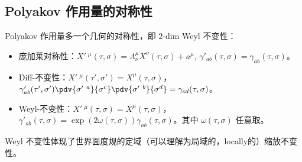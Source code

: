 \subsection{Polyakov 作用量的对称性}
\begin{theorem}{} 
	Polyakov 作用量多一个几何的对称性，即 $2$-dim Weyl 不变性：
	\begin{itemize}
		\item 庞加莱对称性：$X'~ ^\mu(\tau, \sigma) = \Lambda_\nu^\mu X^\nu(\tau, \sigma) + a^\mu$, $\gamma'_{ab}(\tau, \sigma) = \gamma_{ab}(\tau, \sigma)$。
		\item Diff-不变性：$X'~^\mu(\tau', \sigma') = X^\mu(\tau, \sigma)$，$\gamma'_{ab}(\tau', \sigma')  \pdv{\sigma'~ ^a}{\sigma^c} \pdv{\sigma'~^b}{\sigma^d} = \gamma_{cd}(\tau, \sigma)$。
		\item Weyl-不变性：$X'~^\mu(\tau, \sigma) = X^\mu(\tau, \sigma)$，$\gamma'_{ab}(\tau, \sigma) = \exp\left(2 \omega(\tau, \sigma) \right) \gamma_{ab}(\tau, \sigma)$。其中 $\omega(\tau, \sigma)$ 任意取。
	\end{itemize}
	Weyl 不变性体现了世界面度规的定域（可以理解为局域的，locally的）缩放不变性。
\end{theorem}